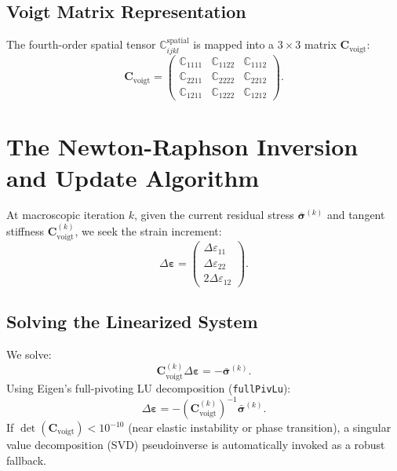 \documentclass[11pt,a4paper]{article}
\begin{document}
\subsection{Voigt Matrix Representation}

The fourth-order spatial tensor $\mathbb{C}_{ijkl}^{\text{spatial}}$ is mapped into a $3 \times 3$ matrix $\mathbf{C}_{\text{voigt}}$:
\begin{equation}
\label{eq:C_voigt}
\mathbf{C}_{\text{voigt}} = \begin{pmatrix}
\mathbb{C}_{1111} & \mathbb{C}_{1122} & \mathbb{C}_{1112} \\
\mathbb{C}_{2211} & \mathbb{C}_{2222} & \mathbb{C}_{2212} \\
\mathbb{C}_{1211} & \mathbb{C}_{1222} & \mathbb{C}_{1212}
\end{pmatrix}.
\end{equation}

\section{The Newton-Raphson Inversion and Update Algorithm}

At macroscopic iteration $k$, given the current residual stress $\bar{\boldsymbol{\sigma}}^{(k)}$ and tangent stiffness $\mathbf{C}_{\text{voigt}}^{(k)}$, we seek the strain increment:
\begin{equation}
\Delta\boldsymbol{\varepsilon} = \begin{pmatrix} \Delta\varepsilon_{11} \\ \Delta\varepsilon_{22} \\ 2\Delta\varepsilon_{12} \end{pmatrix}.
\end{equation}

\subsection{Solving the Linearized System}

We solve:
\begin{equation}
\mathbf{C}_{\text{voigt}}^{(k)} \Delta\boldsymbol{\varepsilon} = -\bar{\boldsymbol{\sigma}}^{(k)}.
\end{equation}
Using Eigen's full-pivoting LU decomposition (\texttt{fullPivLu}):
\begin{equation}
\Delta\boldsymbol{\varepsilon} = - \left( \mathbf{C}_{\text{voigt}}^{(k)} \right)^{-1} \bar{\boldsymbol{\sigma}}^{(k)}.
\end{equation}
If $\det(\mathbf{C}_{\text{voigt}}) < 10^{-10}$ (near elastic instability or phase transition), a singular value decomposition (SVD) pseudoinverse is automatically invoked as a robust fallback.
\end{document}
